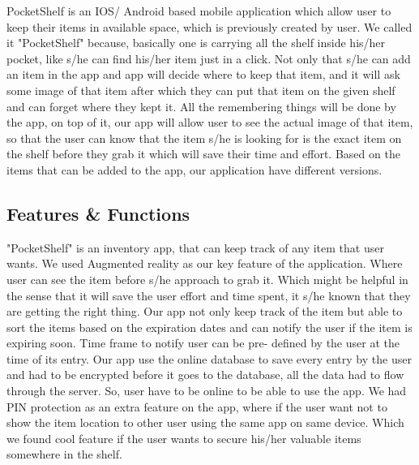 PocketShelf is an IOS/ Android based mobile application which allow user to keep their items in available space, which is previously created by user. We called it "PocketShelf" because, basically one is carrying all the shelf inside his/her pocket, like s/he can find his/her item just in a click. Not only that s/he can add an item in the app and app will decide where to keep that item, and it will ask some image of that item after which they can put that item on the given shelf and can forget where they kept it. All the remembering things will be done by the app, on top of it, our app will allow user to see the actual image of that item, so that the user can know that the item s/he is looking for is the exact item on the shelf before they grab it which will save their time and effort. Based on the items that can be added to the app, our application have different versions. 


\subsection{Features \& Functions}
"PocketShelf" is an inventory app, that can keep track of any item that user wants. We used Augmented reality as our key feature of the application. Where user can see the item before s/he approach to grab it. Which might be helpful in the sense that it will save the user effort and time spent, it s/he known that they are getting the right thing. Our app not only keep track of the item but able to sort the items based on the expiration dates and can notify the user if the item is expiring soon. Time frame to notify user can be pre- defined by the user at the time of its entry. Our app use the online database to save every entry by the user and had to be encrypted before it goes to the database, all the data had to flow through the server. So, user have to be online to be able to use the app. We had PIN protection as an extra feature on the app, where if the user want not to show the item location to other user using the same app on same device. Which we found cool feature if the user wants to secure his/her valuable items somewhere in the shelf.


